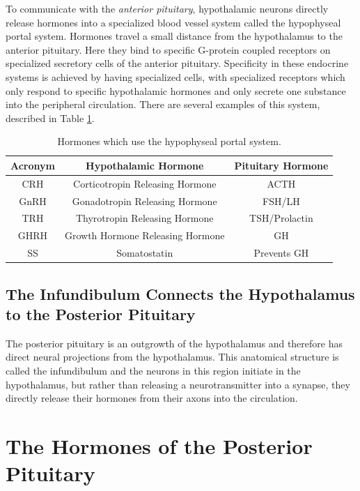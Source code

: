 \documentclass{tufte-handout}
\begin{document}
To communicate with the \emph{anterior pituitary}, hypothalamic neurons directly release hormones into a specialized blood vessel system called the hypophyseal portal system.  Hormones travel a small distance from the hypothalamus to the anterior pituitary.  Here they bind to specific G-protein coupled receptors on specialized secretory cells of the anterior pituitary.  Specificity in these endocrine systems is achieved by having specialized cells, with specialized receptors which only respond to specific hypothalamic hormones and only secrete one substance into the peripheral circulation.  There are several examples of this system, described in Table \ref{tab:anterior-pituitary-hormones}.

\begin{table}
  \centering
  \begin{tabular}{ccc}
    \toprule
    Acronym & Hypothalamic Hormone & Pituitary Hormone \\
    \midrule
    CRH & Corticotropin Releasing Hormone & ACTH \\
    GnRH & Gonadotropin Releasing Hormone & FSH/LH\\
    TRH & Thyrotropin Releasing Hormone & TSH/Prolactin \\
    GHRH & Growth Hormone Releasing Hormone & GH \\
    SS & Somatostatin & Prevents GH \\
    \bottomrule
  \end{tabular}
  \caption{Hormones which use the hypophyseal portal system.}
  \label{tab:anterior-pituitary-hormones}
\end{table}


\subsection{The Infundibulum Connects the Hypothalamus to the Posterior Pituitary}

The posterior pituitary is an outgrowth of the hypothalamus and therefore has direct neural projections from the hypothalamus.  This anatomical structure is called the infundibulum and the neurons in this region initiate in the hypothalamus, but rather than releasing a neurotransmitter into a synapse, they directly release their hormones from their axons into the circulation.

\section{The Hormones of the Posterior Pituitary}
\end{document}
